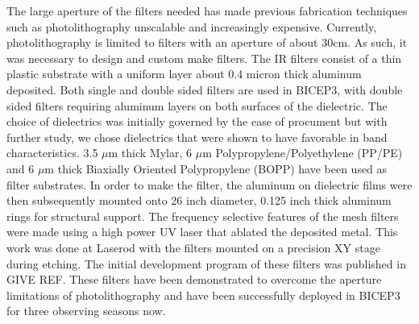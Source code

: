 \documentclass[12pt]{article}
\begin{document}
The large aperture of the filters needed has made previous fabrication techniques such as photolithography unscalable and increasingly expensive. Currently, photolithography is limited to filters with an aperture of about 30cm. As such, it was necessary to design and custom make filters. The IR filters consist of a thin plastic substrate with a uniform layer about 0.4 micron thick aluminum deposited. Both single and double sided filters are used in BICEP3, with double sided filters requiring aluminum layers on both surfaces of the dielectric. The choice of dielectrics was initially governed by the ease of procument but with further study, we chose dielectrics that were shown to have favorable in band characteristics. 3.5 $\mu$m thick Mylar, 6 $\mu$m Polypropylene/Polyethylene (PP/PE) and 6 $\mu$m thick Biaxially Oriented Polypropylene (BOPP) have been used as filter substrates. In order to make the filter, the aluminum on dielectric films were then subsequently mounted onto 26 inch diameter, 0.125 inch thick aluminum rings for structural support. The frequency selective features of the mesh filters were made using a high power UV laser that ablated the deposited metal. This work was done at Laserod with the filters mounted on a precision XY stage during etching. The initial development program of these filters was published in GIVE REF. These filters have been demonstrated to overcome the aperture limitations of photolithography and have been successfully deployed in BICEP3 for three observing seasons now. 
\end{document}

